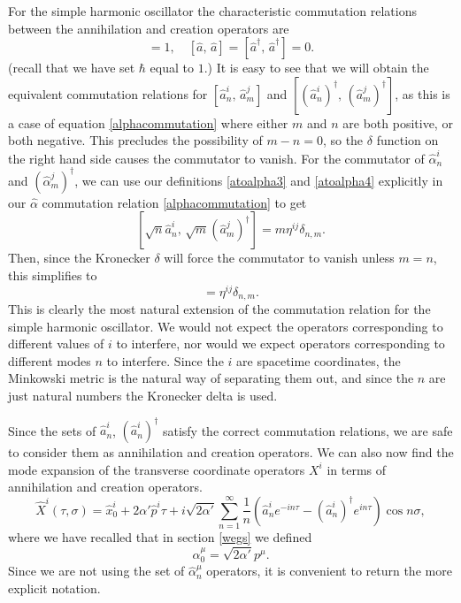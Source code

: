 \documentclass[a4paper,12pt]{article}
\numberwithin{equation}{section}
\begin{document}
For the simple harmonic oscillator the characteristic commutation relations between the annihilation and creation operators are
\begin{equation}
[\hat{a},\,\hat{a}^\dagger] = 1,\quad[\hat{a},\,\hat{a}]=[\hat{a}^\dagger,\,\hat{a}^\dagger]=0.
\end{equation}
(recall that we have set $\hbar$ equal to $1$.) It is easy to see that we will obtain the equivalent commutation relations for $[\hat{a}_n^i,\,\hat{a}_m^j]$ and $[(\hat{a}_n^i)^\dagger,\,(\hat{a}_m^j)^\dagger]$, as this is a case of equation \ref{alphacommutation} where either $m$ and $n$ are both positive, or both negative. This precludes the possibility of $m-n=0$, so the $\delta$ function on the right hand side causes the commutator to vanish. For the commutator of $\hat{\alpha}_n^i$ and $(\hat{\alpha}_m^j)^\dagger$, we can use our definitions \ref{atoalpha3} and \ref{atoalpha4} explicitly in our $\hat{\alpha}$ commutation relation \ref{alphacommutation} to get
\begin{equation}
\left[\sqrt{n}\hat{a}_n^i,\,\sqrt{m}(\hat{a}_m^j)^\dagger\right] = m\eta^{ij}\delta_{n,m}.
\end{equation}
Then, since the Kronecker $\delta$ will force the commutator to vanish unless $m=n$, this simplifies to
\begin{equation}
[\hat{a}_n^i,\,\hat{a}_m^j] = \eta^{i j}\delta_{n,m}.
\end{equation} 
This is clearly the most natural extension of the commutation relation for the simple harmonic oscillator. We would not expect the operators corresponding to different values of $i$ to interfere, nor would we expect operators corresponding to different modes $n$ to interfere. Since the $i$ are spacetime coordinates, the Minkowski metric is the natural way of separating them out, and since the $n$ are just natural numbers the Kronecker delta is used. 

Since the sets of $\hat{a}_n^i$, $(\hat{a}_n^i)^\dagger$ satisfy the correct commutation relations, we are safe to consider them as annihilation and creation operators. We can also now find the mode expansion of the transverse coordinate operators $X^i$ in terms of annihilation and creation operators.
\begin{equation}
\hat{X}^i(\tau, \sigma) = \hat{x}_0^i + 2\alpha'\hat{p}^i\tau + i\sqrt{2\alpha'}\sum_{n=1}^\infty\frac{1}{n}\left(\hat{a}_n^ie^{-in\tau}-(\hat{a}_n^i)^\dagger e^{in\tau}\right)\cos n\sigma,
\end{equation}
where we have recalled that in section \ref{wegs} we defined
\begin{equation}
\alpha_0^\mu = \sqrt{2\alpha'}p^\mu.
\end{equation}
Since we are not using the set of $\hat{\alpha}_n^\mu$ operators, it is convenient to return the more explicit notation. 
\end{document}
